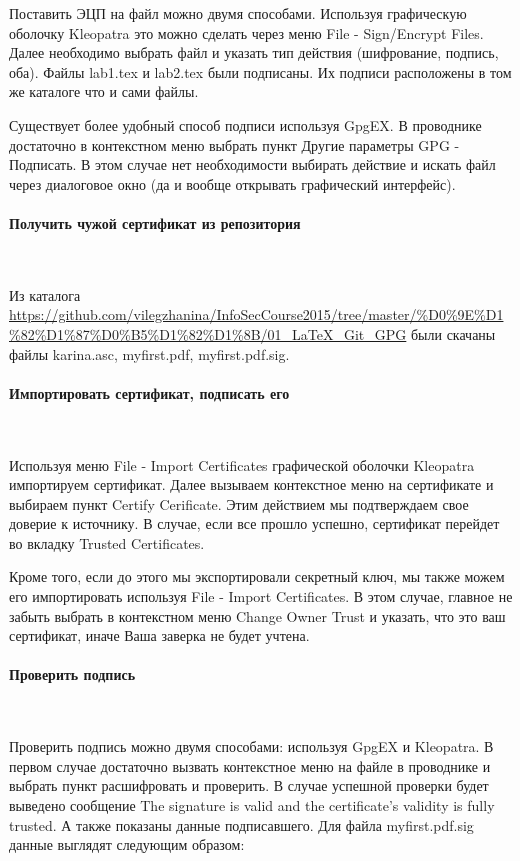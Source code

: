 \documentclass{article}
\begin{document}
Поставить ЭЦП на файл можно двумя способами. Используя графическую оболочку Kleopatra это можно сделать через меню File - Sign/Encrypt Files. Далее необходимо выбрать файл и указать тип действия (шифрование, подпись, оба). Файлы lab1.tex и lab2.tex были подписаны. Их подписи расположены в том же каталоге что и сами файлы.

Существует более удобный способ подписи используя GpgEX. В проводнике достаточно в контекстном меню выбрать пункт Другие параметры GPG - Подписать. В этом случае нет необходимости выбирать действие и искать файл через диалоговое окно (да и вообще открывать графический интерфейс).

\paragraph{Получить чужой сертификат из репозитория}
~

Из каталога 
\url{https://github.com/vilegzhanina/InfoSecCourse2015/tree/master/%D0%9E%D1%82%D1%87%D0%B5%D1%82%D1%8B/01_LaTeX_Git_GPG}
были скачаны файлы karina.asc, myfirst.pdf, myfirst.pdf.sig. 


\paragraph{Импортировать сертификат, подписать его}
~

Используя меню File - Import Certificates графической оболочки Kleopatra импортируем сертификат. Далее вызываем контекстное меню на сертификате и выбираем пункт Certify Cerificate. Этим действием мы подтверждаем свое доверие к источнику. В случае, если все прошло успешно, сертификат перейдет во вкладку Trusted Certificates.

Кроме того, если до этого мы экспортировали секретный ключ, мы также можем его импортировать используя File - Import Certificates. В этом случае, главное не забыть выбрать в контекстном меню Change Owner Trust и указать, что это ваш сертификат, иначе Ваша заверка не будет учтена.

\paragraph{Проверить подпись}
~

Проверить подпись можно двумя способами: используя GpgEX и Kleopatra.
В первом случае достаточно вызвать контекстное меню на файле в проводнике и выбрать пункт расшифровать и проверить. В случае успешной проверки будет выведено сообщение The signature is valid and the certificate's validity is fully trusted. А также показаны данные подписавшего.  Для файла myfirst.pdf.sig данные выглядят следующим образом:
\end{document}
